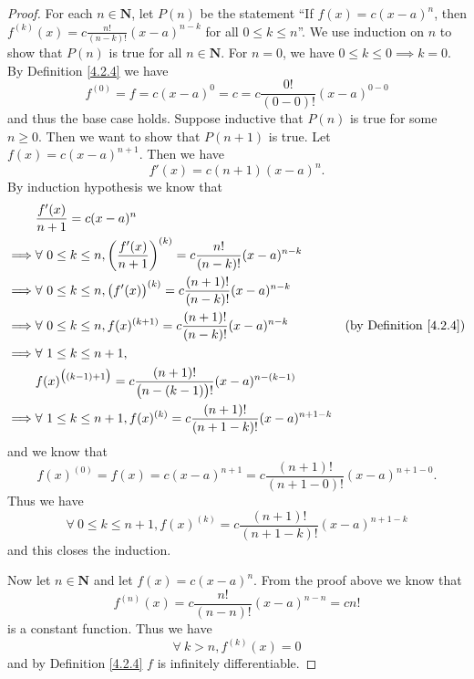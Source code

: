 \begin{proof}
    For each \(n \in \mathbf{N}\), let \(P(n)\) be the statement ``If \(f(x) = c (x - a)^n\), then \(f^{(k)}(x) = c \frac{n!}{(n - k)!} (x - a)^{n - k}\) for all \(0 \leq k \leq n\)''.
    We use induction on \(n\) to show that \(P(n)\) is true for all \(n \in \mathbf{N}\).
    For \(n = 0\), we have \(0 \leq k \leq 0 \implies k = 0\).
    By Definition \ref{4.2.4} we have
    \[
        f^{(0)} = f = c (x - a)^0 = c = c \frac{0!}{(0 - 0)!} (x - a)^{0 - 0}
    \]
    and thus the base case holds.
    Suppose inductive that \(P(n)\) is true for some \(n \geq 0\).
    Then we want to show that \(P(n + 1)\) is true.
    Let \(f(x) = c (x - a)^{n + 1}\).
    Then we have
    \[
        f'(x) = c (n + 1) (x - a)^n.
    \]
    By induction hypothesis we know that
    \begin{align*}
                 & \frac{f'(x)}{n + 1} = c (x - a)^n                                                                                                            \\
        \implies & \forall\ 0 \leq k \leq n, \bigg(\frac{f'(x)}{n + 1}\bigg)^{(k)} = c \frac{n!}{(n - k)!} (x - a)^{n - k}                                      \\
        \implies & \forall\ 0 \leq k \leq n, \big(f'(x)\big)^{(k)} = c \frac{(n + 1)!}{(n - k)!} (x - a)^{n - k}                                                \\
        \implies & \forall\ 0 \leq k \leq n, f(x)^{(k + 1)} = c \frac{(n + 1)!}{(n - k)!} (x - a)^{n - k}                  & \text{(by Definition \ref{4.2.4})} \\
        \implies & \forall\ 1 \leq k \leq n + 1,                                                                                                                \\
                 & f(x)^{\big((k - 1) + 1\big)} = c \frac{(n + 1)!}{\big(n - (k - 1)\big)!} (x - a)^{n - (k - 1)}                                               \\
        \implies & \forall\ 1 \leq k \leq n + 1, f(x)^{(k)} = c \frac{(n + 1)!}{(n + 1 - k)!} (x - a)^{n + 1 - k}
    \end{align*}
    and we know that
    \[
        f(x)^{(0)} = f(x) = c (x - a)^{n + 1} = c \frac{(n + 1)!}{(n + 1 - 0)!} (x - a)^{n + 1 - 0}.
    \]
    Thus we have
    \[
        \forall\ 0 \leq k \leq n + 1, f(x)^{(k)} = c \frac{(n + 1)!}{(n + 1 - k)!} (x - a)^{n + 1 - k}
    \]
    and this closes the induction.

    Now let \(n \in \mathbf{N}\) and let \(f(x) = c (x - a)^n\).
    From the proof above we know that
    \[
        f^{(n)}(x) = c \frac{n!}{(n - n)!} (x - a)^{n - n} = c n!
    \]
    is a constant function.
    Thus we have
    \[
        \forall\ k > n, f^{(k)}(x) = 0
    \]
    and by Definition \ref{4.2.4} \(f\) is infinitely differentiable.
\end{proof}


